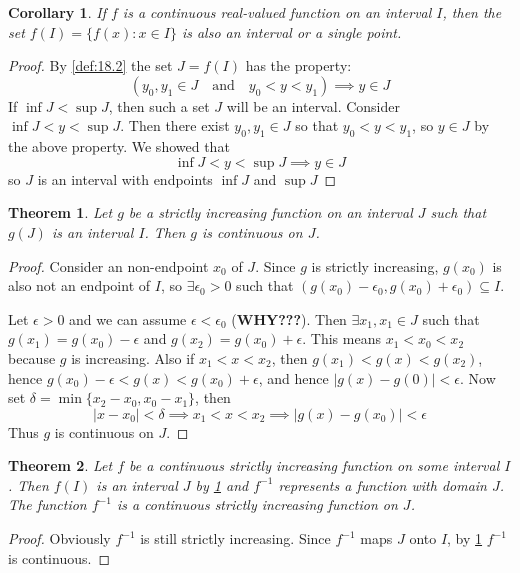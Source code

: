 \documentclass[12pt, lettersize]{book}
\theoremstyle{plain}
\newtheorem{thm}{Theorem}[section]
\newtheorem{cor}{Corollary}[thm]
\theoremstyle{definition}
\theoremstyle{remark}
\begin{document}
			\begin{cor}\label{def:18.3}
			If $f$ is a continuous real-valued function on an interval $I$, then the set $f(I)=\{f(x): x\in I\}$ is also
			an interval or a single point.
			\end{cor}
			\begin{proof}
			By \ref{def:18.2} the set $J=f(I)$ has the property:
			\begin{displaymath}
				(y_0,y_1\in J\quad\text{and}\quad y_0<y<y_1)\implies y\in J
			\end{displaymath}
			If $\inf J<\sup J$, then such a set $J$ will be an interval. Consider $\inf J<y<\sup J$. Then there exist $y_0,y_1\in J$ so that $y_0<y<y_1$, so $y\in J$ by the above property. We showed that
			\begin{displaymath}
				\inf J<y<\sup J \implies y\in J
			\end{displaymath}
			so $J$ is an interval with endpoints $\inf J$ and $\sup J$
			\end{proof}
					
			\begin{thm}\label{def:18.5}
			Let $g$ be a strictly increasing function on an interval $J$ such that $g(J)$ is an interval $I$. Then $g$ is
			continuous on $J$.
			\end{thm}
			\begin{proof}
			Consider an non-endpoint $x_0$ of $J$. Since $g$ is strictly increasing, $g(x_0)$ is also not an endpoint of $I$, so $\exists \epsilon_0>0$ such that $(g(x_0)-\epsilon_0,g(x_0)+\epsilon_0)\subseteq I$.
			
			Let $\epsilon>0$ and we can assume $\epsilon<\epsilon_0$ (\textbf{WHY???}). Then $\exists x_1,x_1\in J$ such that $g(x_1)=g(x_0)-\epsilon$ and $g(x_2)=g(x_0)+\epsilon$. This means $x_1<x_0<x_2$ because $g$ is increasing.
			Also if $x_1<x<x_2$, then $g(x_1)<g(x)<g(x_2)$, hence $g(x_0)-\epsilon<g(x)<g(x_0)+\epsilon$, and hence
			$|g(x)-g(0)|<\epsilon$. Now set $\delta=\min\{x_2-x_0,x_0-x_1\}$, then 
			\begin{displaymath}
				|x-x_0|<\delta\implies x_1<x<x_2\implies|g(x)-g(x_0)|<\epsilon
			\end{displaymath}
			Thus $g$ is continuous on $J$.
			\end{proof}
		
			\begin{thm}\label{def:18.4}
			Let $f$ be a continuous strictly increasing function on some interval $I$. Then $f(I)$ is an interval $J$ by \ref{def:18.3} and $f^{-1}$ represents a function with domain $J$. The function $f^{-1}$ is a continuous strictly increasing function on $J$.
			\end{thm}
			\begin{proof}
			Obviously $f^{-1}$ is still strictly increasing. Since $f^{-1}$ maps $J$ onto $I$, by \ref{def:18.5} $f^{-1}$ is continuous.
			\end{proof}
			
\end{document}
